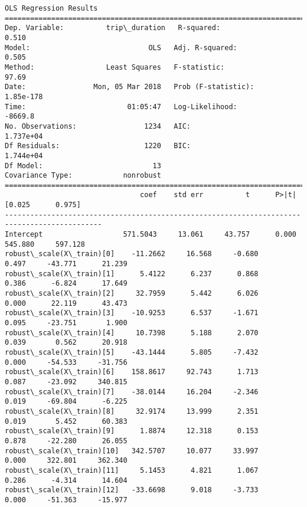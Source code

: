 \documentclass[11pt]{article}
\begin{document}
    \begin{Verbatim}[commandchars=\\\{\}]
                            OLS Regression Results                            
==============================================================================
Dep. Variable:          trip\_duration   R-squared:                       0.510
Model:                            OLS   Adj. R-squared:                  0.505
Method:                 Least Squares   F-statistic:                     97.69
Date:                Mon, 05 Mar 2018   Prob (F-statistic):          1.85e-178
Time:                        01:05:47   Log-Likelihood:                -8669.8
No. Observations:                1234   AIC:                         1.737e+04
Df Residuals:                    1220   BIC:                         1.744e+04
Df Model:                          13                                         
Covariance Type:            nonrobust                                         
=============================================================================================
                                coef    std err          t      P>|t|      [0.025      0.975]
---------------------------------------------------------------------------------------------
Intercept                   571.5043     13.061     43.757      0.000     545.880     597.128
robust\_scale(X\_train)[0]    -11.2662     16.568     -0.680      0.497     -43.771      21.239
robust\_scale(X\_train)[1]      5.4122      6.237      0.868      0.386      -6.824      17.649
robust\_scale(X\_train)[2]     32.7959      5.442      6.026      0.000      22.119      43.473
robust\_scale(X\_train)[3]    -10.9253      6.537     -1.671      0.095     -23.751       1.900
robust\_scale(X\_train)[4]     10.7398      5.188      2.070      0.039       0.562      20.918
robust\_scale(X\_train)[5]    -43.1444      5.805     -7.432      0.000     -54.533     -31.756
robust\_scale(X\_train)[6]    158.8617     92.743      1.713      0.087     -23.092     340.815
robust\_scale(X\_train)[7]    -38.0144     16.204     -2.346      0.019     -69.804      -6.225
robust\_scale(X\_train)[8]     32.9174     13.999      2.351      0.019       5.452      60.383
robust\_scale(X\_train)[9]      1.8874     12.318      0.153      0.878     -22.280      26.055
robust\_scale(X\_train)[10]   342.5707     10.077     33.997      0.000     322.801     362.340
robust\_scale(X\_train)[11]     5.1453      4.821      1.067      0.286      -4.314      14.604
robust\_scale(X\_train)[12]   -33.6698      9.018     -3.733      0.000     -51.363     -15.977

\end{Verbatim}
\end{document}
